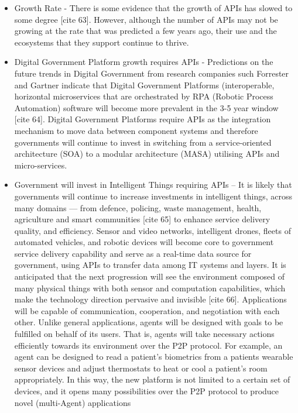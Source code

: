 \begin{itemize}
	\item Growth Rate - There is some evidence that the growth of APIs has slowed
	to some degree [cite 63]. However, although the number of APIs may not be
	growing at the rate that was predicted a few years ago, their use and the
	ecosystems that they support continue to thrive.
	\item Digital Government Platform growth requires APIs - Predictions on the
	future trends in Digital Government from research companies such Forrester
	and Gartner indicate that Digital Government Platforms (interoperable,
	horizontal microservices that are orchestrated by RPA (Robotic Process
	Automation) software will become more prevalent in the 3-5 year window [cite 64].
	Digital Government Platforms require APIs as the integration mechanism to move
	data between component systems and therefore governments will continue to
	invest in switching from a service-oriented architecture (SOA) to a modular
	architecture (MASA) utilising APIs and micro-services.
	\item Government will invest in Intelligent Things requiring APIs – It is
	likely that governments will continue to increase investments in intelligent
	things, across many domains — from defence,	policing, waste management, health, agriculture and smart communities [cite 65] to enhance service delivery quality,
	and	efficiency. Sensor and video networks, intelligent drones, fleets of automated
	vehicles, and robotic devices will become core to government service delivery
	capability and serve as a real-time data source for government, using APIs to
	transfer data among IT systems and layers. It is anticipated that the next
	progression will see the environment composed of many physical things with both
	sensor and computation capabilities, which make the technology direction
	pervasive and invisible [cite 66].	Applications will be capable of
	communication, cooperation, and negotiation with each other. Unlike general
	applications, agents will be designed with goals to be fulfilled on behalf
	of its users. That is, agents will take necessary actions efficiently towards
	its environment over the P2P protocol. For example, an agent can be designed
	to read a patient’s biometrics from a patients wearable sensor devices and
	adjust thermostats to heat or cool a patient’s room appropriately. In this way,
	the new platform is not limited to a certain set of devices, and it opens many possibilities over the P2P protocol to produce novel (multi-Agent) applications

\end{itemize}
